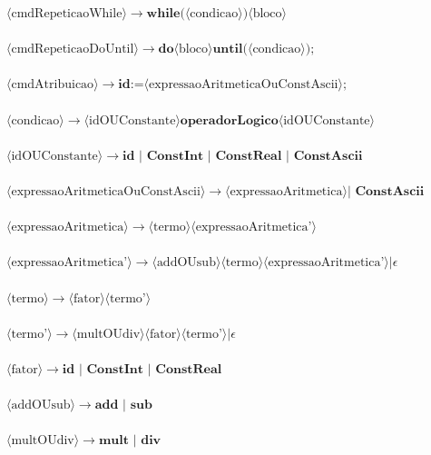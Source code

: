 \documentclass[11pt]{article}
\begin{document}
$\langle\text{cmdRepeticaoWhile}\rangle \rightarrow \textbf{while(} \langle\text{condicao}\rangle \textbf{)} \langle\text{bloco}\rangle $\\\\
$\langle\text{cmdRepeticaoDoUntil}\rangle \rightarrow \textbf{do} \langle\text{bloco}\rangle \textbf{until(} \langle\text{condicao}\rangle \textbf{)} \textbf{;}$\\\\
$\langle\text{cmdAtribuicao}\rangle \rightarrow  \textbf{id} \textbf{:=} \langle\text{expressaoAritmeticaOuConstAscii}\rangle \textbf{;} $\\\\
$\langle\text{condicao}\rangle \rightarrow  \langle\text{idOUConstante}\rangle \textbf{operadorLogico} \langle\text{idOUConstante}\rangle $\\\\%
$\langle\text{idOUConstante}\rangle \rightarrow  \textbf{id }|  \textbf{ ConstInt } | \textbf{ ConstReal } | \textbf{ ConstAscii}$\\\\
$\langle\text{expressaoAritmeticaOuConstAscii}\rangle \rightarrow \langle\text{expressaoAritmetica}\rangle | \textbf{ ConstAscii}$\\\\
$\langle\text{expressaoAritmetica}\rangle \rightarrow  \langle\text{termo}\rangle \langle\text{expressaoAritmetica'}\rangle$\\\\
$\langle\text{expressaoAritmetica'}\rangle \rightarrow \langle\text{addOUsub}\rangle \langle\text{termo}\rangle \langle\text{expressaoAritmetica'}\rangle | \epsilon $\\\\
$\langle\text{termo}\rangle \rightarrow \langle\text{fator}\rangle \langle\text{termo'}\rangle $\\\\
$\langle\text{termo'}\rangle \rightarrow \langle\text{multOUdiv}\rangle \langle\text{fator}\rangle \langle\text{termo'}\rangle | \epsilon $\\\\
$\langle\text{fator}\rangle \rightarrow \textbf{id }| \textbf{ ConstInt } | \textbf{ ConstReal } $\\\\
$\langle\text{addOUsub}\rangle \rightarrow  \textbf{add } | \textbf{ sub}$ \\\\
$\langle\text{multOUdiv}\rangle \rightarrow  \textbf{mult } | \textbf{ div}$ \\\\
\end{document}
